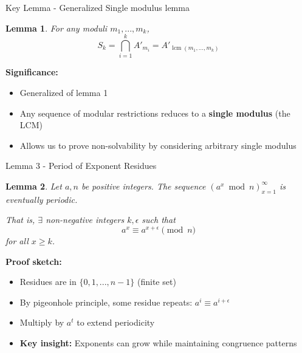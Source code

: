 ﻿\documentclass[10pt,aspectratio=169]{beamer}
\newtheorem{lemmas}{Lemma}
\begin{document}
\begin{frame}{Key Lemma - Generalized Single modulus lemma}
    \begin{lemmas}
        For any moduli $m_1,...,m_k$,
        \[S_k = \bigcap_{i=1}^k A'_{m_i} = A'_{\operatorname{lcm}(m_1,...,m_k)}\]
    \end{lemmas}
    
    \textbf{Significance:}
    \begin{itemize}
    \item  Generalized of lemma 1
        \item Any sequence of modular restrictions reduces to a \textbf{single modulus} (the LCM)
        \item Allows us to prove non-solvability by considering arbitrary single modulus
    \end{itemize}
\end{frame}
\begin{frame}{Lemma 3 - Period of Exponent Residues}
    \begin{lemmas}
        Let $a,n$ be positive integers. The sequence $(a^x \bmod n)_{x=1}^\infty$ is eventually periodic.
        
        That is, $\exists$ non-negative integers $k,\epsilon$ such that
        \[a^x \equiv a^{x+\epsilon} \pmod n\]
        for all $x \geq k$.
    \end{lemmas}
    
    \textbf{Proof sketch:}
    \begin{itemize}
        \item Residues are in $\{0,1,...,n-1\}$ (finite set)
        \item By pigeonhole principle, some residue repeats: $a^i \equiv a^{i+\epsilon}$
        \item Multiply by $a^t$ to extend periodicity
        \item  \textbf{Key insight:} Exponents can grow while maintaining congruence patterns
    \end{itemize}
    
    
\end{frame}
\end{document}
